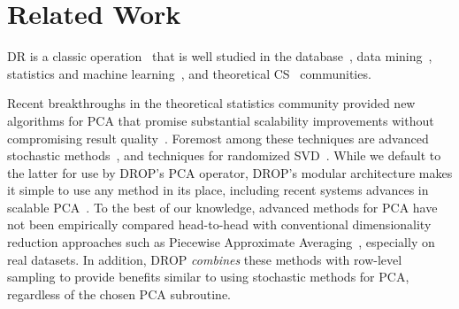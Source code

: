 \section{Related Work}
\label{sec:relwork}
\label{sec:relatedwork}

 DR is a
classic operation~\cite{dr-survey1,dr-survey2,trefethen,nonlinear-dr} that is
well studied in the
database~\cite{keogh-indexing,local-dr,charu-ss,dynamic-ss}, data
mining~\cite{sax,paa}, statistics and machine
learning~\cite{alecton,shamir}, and theoretical CS~\cite{bernstein,pca-stoc} communities.

Recent breakthroughs in the theoretical
statistics community provided new algorithms for PCA that promise
substantial scalability improvements without compromising result
quality~\cite{alecton,tropp,re-new}. 
Foremost among these techniques are advanced stochastic methods~\cite{re-new,shamir}, and techniques for randomized SVD~\cite{tropp}.
While we default to the latter for use by DROP's PCA operator, DROP's modular architecture makes it simple to use any method in its place, including recent systems advances in scalable PCA~\cite{ppca-sigmod}.
To the best of our knowledge, advanced methods for PCA
have not been empirically compared head-to-head with conventional
dimensionality reduction approaches such as Piecewise Approximate
Averaging~\cite{paa}, especially on real datasets. 
In addition, DROP
\emph{combines} these methods with row-level sampling to provide benefits similar to using stochastic methods for PCA, regardless of the chosen PCA subroutine. 



